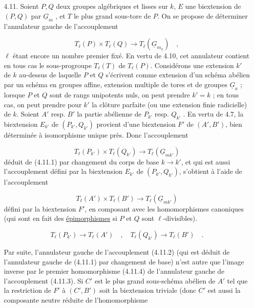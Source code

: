 
4.11.  Soient $P,Q$ deux groupes algébriques et lisses sur $k$, $E$ une biextension de $(P,Q)$ par $\underline{G}_m$ , et $T$ le plus grand sous-tore de $P$. On se propose de déterminer l'annulateur gauche de l'accouplement

\begin{equation}\tag{4.11.1}
T_\ell(P) \times T_\ell(Q) \longrightarrow T_\ell(\underline{G}_{m_k}) \quad ,
\end{equation}
$\ell$ étant encore un nombre premier fixé.  En vertu de 4.10, cet annulateur contient en tous cas le sous-progroupe $T_\ell(T)$ de $T_\ell(P)$. Considérons une extension $k'$ de $k$ au-dessus de laquelle $P$ et $Q$ s'écrivent comme extension d'un schéma abélien par un schéma en groupes affine, extension multiple de tores et de groupes $\underline{G}_a$ ; lorsque $P$ et $Q$ sont de rangs unipotents nuls, on peut prendre $k'=k$ ; en tous cas, on peut prendre pour $k'$ la clôture parfaite (ou une extension finie radicielle) de $k$. Soient $A'$ resp. $B'$ la partie abélienne de $P_{k'}$ resp. $Q_{k'}$ . En vertu de 4.7, la biextension $E_{k'}$ de $(P_{k'},Q_{k'})$ provient d'une biextension $F'$ de $(A',B')$, bien déterminée à isomorphisme unique près. Donc l'accouplement

\begin{equation}\tag{4.11.2}
T_\ell(P_{k'}) \times T_\ell(Q_{k'}) \longrightarrow T_\ell(\underline{G}_{mk'})
\end{equation}
déduit de (4.11.1) par changement du corps de base $k \longrightarrow k'$, et qui est aussi l'accouplement défini par la biextension $E_{k'}$ de $(P_{k'},Q_{k'})$, s'obtient à l'aide de l'accouplement

\begin{equation}\tag{4.11.3}
T_\ell(A') \times T_\ell(B') \longrightarrow T_\ell(\underline{G}_{mk'})
\end{equation}
défini par la biextension $F'$, en composant avec les homomorphismes canoniques (qui sont en fait des \underline{épimorphismes} si $P$ et $Q$ sont $\ell$-divisibles).

\begin{equation}\tag{4.11.4}
T_\ell(P_{k'}) \longrightarrow T_\ell(A') \quad , \quad T_\ell(Q_{k'}) \longrightarrow T_\ell(B') \quad .
\end{equation}


Par suite, l'annulateur gauche de l'accouplement (4.11.2) (qui est déduit de l'annulateur gauche de (4.11.1) par changement de base) n'est autre que l'image inverse par le premier homomorphisme (4.11.4) de l'annulateur gauche de l'accouplement (4.11.3). Si $C'$ est le plus grand sous-schéma abélien de $A'$ tel que la restriction de $F'$ à $(C',B')$ soit la biextension triviale (donc $C'$ est aussi la composante neutre réduite de l'homomorphisme

